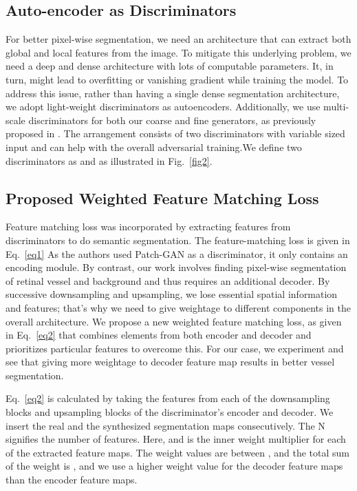 \documentclass[runningheads]{llncs}
\begin{document}
\subsection{Auto-encoder as Discriminators}
\label{subsec:discriminators}
For better pixel-wise segmentation, we need an architecture that can extract both global and local features from the image. To mitigate this underlying problem, we need a deep and dense architecture with lots of computable parameters. It, in turn, might lead to overfitting or vanishing gradient while training the model. To address this issue, rather than having a single dense segmentation architecture, we adopt light-weight discriminators as autoencoders. Additionally, we use multi-scale discriminators for both our coarse and fine generators, as previously proposed in \cite{li2016precomputed,wang2018high}. The arrangement consists of two discriminators with variable sized input and can help with the overall adversarial training.We define two discriminators as  and  as illustrated in Fig.~\ref{fig2}. 

\subsection{Proposed Weighted Feature Matching Loss}
Feature matching loss \cite{wang2018high} was incorporated by extracting features from discriminators to do semantic segmentation. The feature-matching loss is given in Eq.~\ref{eq1} As the authors used Patch-GAN as a discriminator, it only contains an encoding module. By contrast, our work involves finding pixel-wise segmentation of retinal vessel and background and thus requires an additional decoder. By successive downsampling and upsampling, we lose essential spatial information and features; that's why we need to give weightage to different components in the overall architecture. We propose a new weighted feature matching loss, as given in Eq.~\ref{eq2} that combines elements from both encoder and decoder and prioritizes particular features to overcome this. For our case, we experiment and see that giving more weightage to decoder feature map results in better vessel segmentation.
 

Eq.~\ref{eq2} is calculated by taking the features from each of the downsampling blocks and upsampling blocks of the discriminator's encoder and decoder. We insert the real and the synthesized segmentation maps consecutively. The N signifies the number of features. Here,  and  is the inner weight multiplier for each of the extracted feature maps. The weight values are between , and the total sum of the weight is , and we use a higher weight value for the decoder feature maps than the encoder feature maps.
\end{document}
